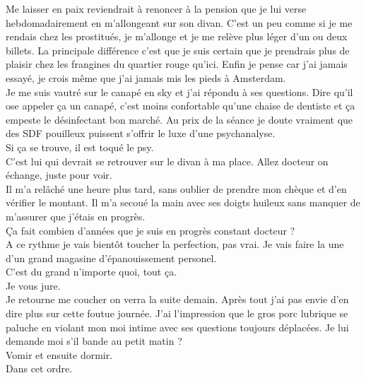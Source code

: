Me laisser en paix reviendrait à renoncer à la pension que je lui verse hebdomadairement en m'allongeant sur son divan. C'est un peu comme si je me rendais chez les prostitués, je m'allonge et je me relève plus léger d'un ou deux billets. La principale différence c'est que je suis certain que je prendrais plus de plaisir chez les frangines du quartier rouge qu'ici. Enfin je pense car j'ai jamais essayé, je crois même que j'ai jamais mis les pieds à Amsterdam.\\

Je me suis vautré sur le canapé en sky et j'ai répondu à ses questions. Dire qu'il ose appeler ça un canapé, c'est moins confortable qu'une chaise de dentiste et ça empeste le désinfectant bon marché. Au prix de la séance je doute vraiment que des SDF pouilleux puissent s'offrir le luxe d'une psychanalyse. \\
Si ça se trouve, il est toqué le psy.\\
C'est lui qui devrait se retrouver sur le divan à ma place. Allez docteur on échange, juste pour voir.\\

Il m'a relâché une heure plus tard, sans oublier de prendre mon chèque et d'en vérifier le montant. Il m'a secoué la main avec ses doigts huileux sans manquer de m'assurer que j'étais en progrès. \\

Ça fait combien d'années que je suis en progrès constant docteur ? \\
A ce rythme je vais bientôt toucher la perfection, pas vrai. Je vais faire la une d'un grand magasine d'épanouissement personel.\\

C'est du grand n'importe quoi, tout ça.\\
Je vous jure. \\

Je retourne me coucher on verra la suite demain. Après tout j'ai pas envie d'en dire plus sur cette foutue journée. J'ai l'impression que le gros porc lubrique se paluche en violant mon moi intime avec ses questions toujours déplacées. Je lui demande moi s'il bande au petit matin ? \\

Vomir et ensuite dormir. \\
Dans cet ordre.